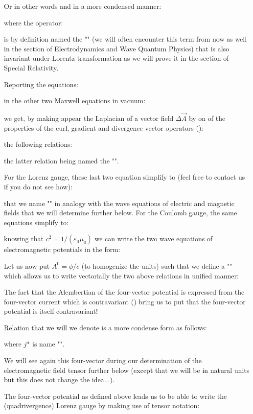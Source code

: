 	Or in other words and in a more condensed manner:
	
	where the operator:
	
	is by definition named the "" (we will often encounter this term from now as well in the section of Electrodynamics and Wave Quantum Physics) that is also invariant under Lorentz transformation as we will prove it in the section of Special Relativity.
	
	Reporting the equations:
	
	in the other two Maxwell equations in vacuum:
	
	we get, by making appear the Laplacian of a vector field $\Delta \vec{A}$ by on of the properties of the curl, gradient and divergence vector operators ():
	
	the following relations:
	
	the latter relation being named the "".
	
	For the Lorenz gauge, these last two equation simplify to (feel free to contact us if you do not see how):
	
	that we name "" in analogy with the wave equations of electric and magnetic fields that we will determine further below.
	For the Coulomb gauge, the same equations simplify to:
	
	knowing that $c^2=1/(\varepsilon_0\mu_0)$ we can write the two wave equations of electromagnetic potentials in the form:
	
	Let us now put $A^0=\phi/c$ (to homogenize the units) such that we define a "" which allows us to write vectorially the two above relations in unified manner:
	 
	\begin{tcolorbox}[title=Remark,colframe=black,arc=10pt]
	The fact that the Alembertian of the four-vector potential  is expressed from the four-vector current which is contravariant () bring us to put that the four-vector potential is itself contravariant!
	\end{tcolorbox}
	Relation that we will we denote is a more condense form as follows:
	
	where $j^\alpha$ is name "".
	\begin{tcolorbox}[title=Remark,colframe=black,arc=10pt]
	We will see again this four-vector during our determination of the electromagnetic field tensor further below (except that we will be in natural units but this does not change the idea...).
	\end{tcolorbox}
	The four-vector potential as defined above leads us to be able to write the (quadrivergence) Lorenz gauge by making use of tensor notation:
	
